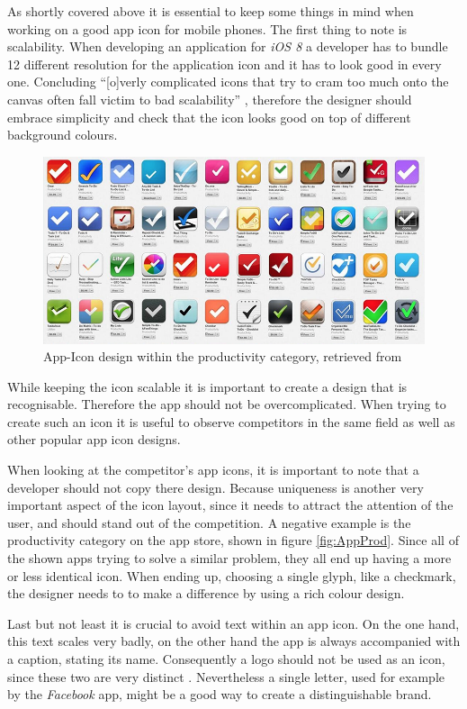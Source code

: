 As shortly covered above it is essential to keep some things in mind when working on a good app icon for mobile phones. The first thing to note is scalability. When developing an application for \emph{iOS 8} a developer has to bundle 12 different resolution for the application icon and it has to look good in every one. Concluding \enquote{[o]verly complicated icons that try to cram too much onto the canvas often fall victim to bad scalability} \cite{Flarup:2015aa}, therefore the designer should embrace simplicity and check that the icon looks good on top of different background colours. \cite{Flarup:2015aa}

\begin{figure}[h]
  	\centering
  	\includegraphics[width=0.7\linewidth]{./images/productivity-icons.png}
  	\caption{App-Icon design within the productivity category, retrieved from \cite{Flarup:2015aa}}
	\label{fig:AppProd}
\end{figure}
\nocite{Flarup:2015aa}

While keeping the icon scalable it is important to create a design that is recognisable. Therefore the app should not be overcomplicated. When trying to create such an icon it is useful to observe competitors in the same field as well as other popular app icon designs. \cite{Flarup:2015aa}

When looking at the competitor's app icons, it is important to note that a developer should not copy there design. Because uniqueness is another very important aspect of the icon layout, since it needs to attract the attention of the user, and should stand out of the competition. A negative example is the productivity category on the app store, shown in figure \vref{fig:AppProd}. Since all of the shown apps trying to solve a similar problem, they all end up having a more or less identical icon. When ending up, choosing a single glyph, like a checkmark, the designer needs to to make a difference by using a rich colour design. \cite{Flarup:2015aa}

Last but not least it is crucial to avoid text within an app icon. On the one hand, this text scales very badly, on the other hand the app is always accompanied with a caption, stating its name. Consequently a logo should not be used as an icon, since these two are very distinct \cite{Flarup:2015ab}. Nevertheless a single letter, used for example by the \emph{Facebook} app, might be a good way to create a distinguishable brand.

